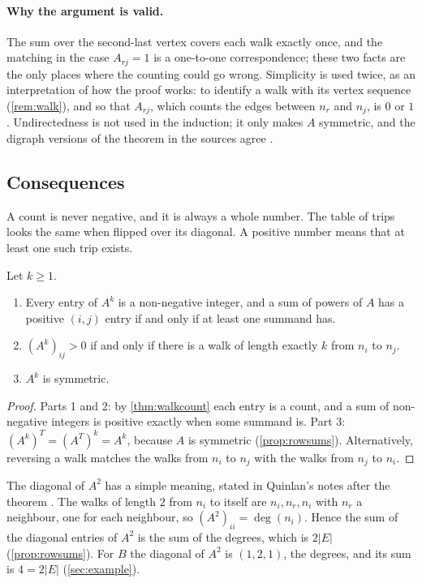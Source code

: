 \paragraph{Why the argument is valid.}
The sum over the second-last vertex covers each walk exactly once, and the matching in the case $A_{rj}=1$ is a one-to-one correspondence; these two facts are the only places where the counting could go wrong.
Simplicity is used twice, as an interpretation of how the proof works: to identify a walk with its vertex sequence (\cref{rem:walk}), and so that $A_{rj}$, which counts the edges between $n_r$ and $n_j$, is $0$ or $1$.
Undirectedness is not used in the induction; it only makes $A$ symmetric, and the digraph versions of the theorem in the sources agree \cite{grinberg2025graph,lehman_mcs_adjacency}.

\subsection{Consequences}\label{sec:consequences}

\plainwords A count is never negative, and it is always a whole number.
The table of trips looks the same when flipped over its diagonal.
A positive number means that at least one such trip exists.

\begin{corollary}\label{cor:walkcount}
Let $k\ge 1$.
\begin{enumerate}
\item Every entry of $A^k$ is a non-negative integer, and a sum of powers of $A$ has a positive $(i,j)$ entry if and only if at least one summand has.
\item $(A^k)_{ij}>0$ if and only if there is a walk of length exactly $k$ from $n_i$ to $n_j$.
\item $A^k$ is symmetric.
\end{enumerate}
\end{corollary}

\begin{proof}
Parts 1 and 2: by \cref{thm:walkcount} each entry is a count, and a sum of non-negative integers is positive exactly when some summand is.
Part 3: $(A^k)^{T}=(A^{T})^k=A^k$, because $A$ is symmetric (\cref{prop:rowsums}).
Alternatively, reversing a walk matches the walks from $n_i$ to $n_j$ with the walks from $n_j$ to $n_i$.
\end{proof}

The diagonal of $A^2$ has a simple meaning, stated in Quinlan's notes after the theorem \cite{quinlan_matrices_graphs}.
The walks of length $2$ from $n_i$ to itself are $n_i,n_r,n_i$ with $n_r$ a neighbour, one for each neighbour, so $(A^2)_{ii}=\deg(n_i)$.
Hence the sum of the diagonal entries of $A^2$ is the sum of the degrees, which is $2|E|$ (\cref{prop:rowsums}).
For $B$ the diagonal of $A^2$ is $(1,2,1)$, the degrees, and its sum is $4=2|E|$ (\cref{sec:example}).

